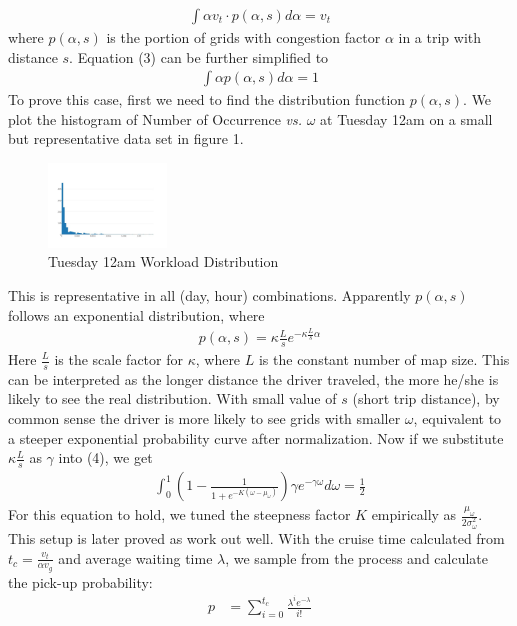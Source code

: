 \documentclass[letterpaper, 10 pt, conference]{ieeeconf}
\begin{document}
\begin{enumerate}
\begin{align}
\int \alpha v_t\cdot p(\alpha, s)d\alpha = v_t
\end{align}
where $p(\alpha, s)$ is the portion of grids with congestion factor $\alpha$ in a trip with distance $s$. Equation (3) can be further simplified to
\begin{align}
\int \alpha p(\alpha, s)d\alpha = 1
\end{align}
To prove this case, first we need to find the distribution function $p(\alpha,s)$. We plot the histogram of Number of Occurrence \textit{vs.} $\omega$ at Tuesday 12am on a small but representative data set in figure 1. 
\begin{figure}
\centering
\includegraphics[width=0.28\textwidth]{0am-busy.jpeg}
\caption{Tuesday 12am Workload Distribution}
\end{figure}
This is representative in all (day, hour) combinations. Apparently $p(\alpha, s)$ follows an exponential distribution, where
\begin{align}
p(\alpha, s) = \kappa\frac{L}{s}e^{-\kappa\frac{L}{s}\alpha}
\end{align}
Here $\frac{L}{s}$ is the scale factor for $\kappa$, where $L$ is the constant number of map size. This can be interpreted as the longer distance the driver traveled, the more he/she is likely to see the real distribution. With small value of $s$ (short trip distance), by common sense the driver is more likely to see grids with smaller $\omega$, equivalent to a steeper exponential probability curve after normalization. Now if we substitute $\kappa\frac{L}{s}$ as $\gamma$ into (4), we get 
\begin{align}
\int_{0}^{1}(1-\frac{1}{1+e^{-K(\omega-\mu_\omega)}})\gamma e^{-\gamma\omega}d\omega = \frac{1}{2}
\end{align}
For this equation to hold, we tuned the steepness factor $K$ empirically as $\frac{\mu_\omega}{2\sigma_\omega^2}$. This setup is later proved as work out well.
With the cruise time calculated from $t_c = \frac{v_t}{\alpha v_g}$ and average waiting time $\lambda$, we sample from the process and calculate the pick-up probability:
\begin{align}
p &= \sum_{i=0}^{t_c}\frac{\lambda^ie^{-\lambda}}{i!}

\end{align}
\end{enumerate}
\end{document}
